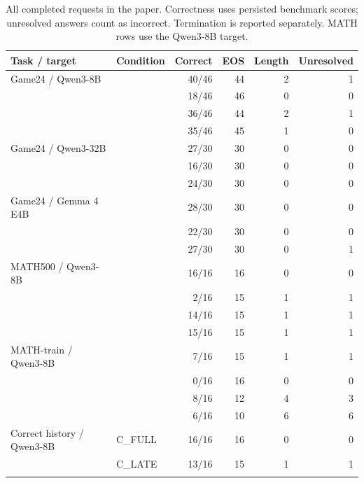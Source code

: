 \begin{table}[H]
\centering\small
\caption{All completed requests in the paper. Correctness uses persisted benchmark scores; unresolved answers count as incorrect. Termination is reported separately. MATH rows use the Qwen3-8B target.}
\label{tab:diagnostics}
\begin{tabular}{llrrrr}
\toprule
Task / target & Condition & Correct & EOS & Length & Unresolved \\
\midrule
Game24 / Qwen3-8B & \clean{} & 40/46 & 44 & 2 & 1 \\
 & \fullaccess{} & 18/46 & 46 & 0 & 0 \\
 & \lateblock{} & 36/46 & 44 & 2 & 1 \\
 & \pathblock{} & 35/46 & 45 & 1 & 0 \\
\addlinespace[3pt]
Game24 / Qwen3-32B & \clean{} & 27/30 & 30 & 0 & 0 \\
 & \fullaccess{} & 16/30 & 30 & 0 & 0 \\
 & \lateblock{} & 24/30 & 30 & 0 & 0 \\
\addlinespace[3pt]
Game24 / Gemma 4 E4B & \clean{} & 28/30 & 30 & 0 & 0 \\
 & \fullaccess{} & 22/30 & 30 & 0 & 0 \\
 & \lateblock{} & 27/30 & 30 & 0 & 1 \\
\addlinespace[3pt]
MATH500 / Qwen3-8B & \clean{} & 16/16 & 16 & 0 & 0 \\
 & \fullaccess{} & 2/16 & 15 & 1 & 1 \\
 & \lateblock{} & 14/16 & 15 & 1 & 1 \\
 & \pathblock{} & 15/16 & 15 & 1 & 1 \\
\addlinespace[3pt]
MATH-train / Qwen3-8B & \clean{} & 7/16 & 15 & 1 & 1 \\
 & \fullaccess{} & 0/16 & 16 & 0 & 0 \\
 & \lateblock{} & 8/16 & 12 & 4 & 3 \\
 & \pathblock{} & 6/16 & 10 & 6 & 6 \\
\addlinespace[3pt]
Correct history / Qwen3-8B & C\_FULL & 16/16 & 16 & 0 & 0 \\
 & C\_LATE & 13/16 & 15 & 1 & 1 \\
\addlinespace[3pt]
\bottomrule
\end{tabular}
\end{table}
